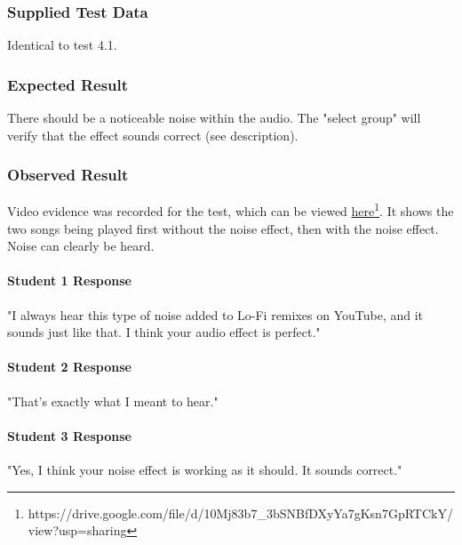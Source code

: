 \paragraph{}
{
	\centering
}

\subsubsection*{Supplied Test Data}
Identical to test 4.1.

\subsubsection*{Expected Result}
There should be a noticeable noise within the audio. The "select group" will verify that the effect sounds correct (see description).

\subsubsection*{Observed Result}
\label{sec:evidence4.2}
Video evidence was recorded for the test, which can be viewed \href{https://drive.google.com/file/d/10Mj83b7_3bSNBfDXyYa7gKsn7GpRTCkY/view?usp=sharing}{here}\footnote{
	https://drive.google.com/file/d/10Mj83b7\_3bSNBfDXyYa7gKsn7GpRTCkY/view?usp=sharing
}. It shows the two songs being played first without the noise effect, then with the noise effect. Noise can clearly be heard.

\paragraph{Student 1 Response}
"I always hear this type of noise added to Lo-Fi remixes on YouTube, and it sounds just like that. I think your audio effect is perfect."

\paragraph{Student 2 Response}
"That's exactly what I meant to hear."

\paragraph{Student 3 Response}
"Yes, I think your noise effect is working as it should. It sounds correct."

